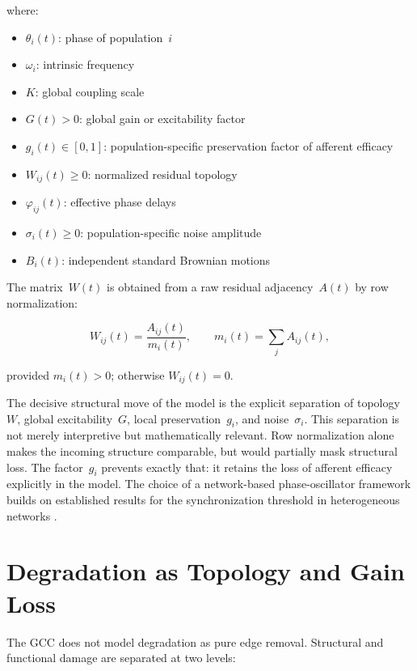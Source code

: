 ﻿\documentclass[11pt,a4paper]{article}
\theoremstyle{plain}
\theoremstyle{definition}
\theoremstyle{remark}
\begin{document}
where:
\begin{itemize}
  \item $\theta_i(t)$: phase of population~$i$
  \item $\omega_i$: intrinsic frequency
  \item $K$: global coupling scale
  \item $G(t) > 0$: global gain or excitability factor
  \item $g_i(t) \in [0,1]$: population-specific preservation factor of afferent efficacy
  \item $W_{ij}(t) \geq 0$: normalized residual topology
  \item $\varphi_{ij}(t)$: effective phase delays
  \item $\sigma_i(t) \geq 0$: population-specific noise amplitude
  \item $B_i(t)$: independent standard Brownian motions
\end{itemize}

The matrix~$W(t)$ is obtained from a raw residual adjacency~$A(t)$ by row normalization:

\begin{equation}
\label{eq:normierung}
W_{ij}(t) = \frac{A_{ij}(t)}{m_i(t)}, \qquad m_i(t) = \sum_j A_{ij}(t),
\end{equation}

provided $m_i(t) > 0$; otherwise $W_{ij}(t) = 0$.

The decisive structural move of the model is the explicit separation of topology~$W$, global excitability~$G$, local preservation~$g_i$, and noise~$\sigma_i$. This separation is not merely interpretive but mathematically relevant. Row normalization alone makes the incoming structure comparable, but would partially mask structural loss. The factor~$g_i$ prevents exactly that: it retains the loss of afferent efficacy explicitly in the model. The choice of a network-based phase-oscillator framework builds on established results for the synchronization threshold in heterogeneous networks \citep{restrepo2005}.


\section{Degradation as Topology and Gain Loss}
\label{sec:abbau}
\label{sec:degradation}

The GCC does not model degradation as pure edge removal. Structural and functional damage are separated at two levels:
\end{document}
